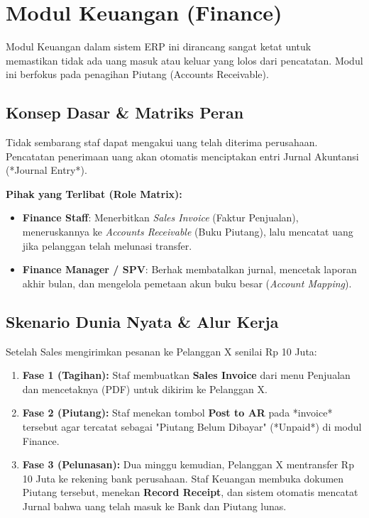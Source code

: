 \chapter{Modul Keuangan (Finance)}

Modul Keuangan dalam sistem ERP ini dirancang sangat ketat untuk memastikan tidak ada uang masuk atau keluar yang lolos dari pencatatan. Modul ini berfokus pada penagihan Piutang (Accounts Receivable).

\section{Konsep Dasar \& Matriks Peran}
Tidak sembarang staf dapat mengakui uang telah diterima perusahaan. Pencatatan penerimaan uang akan otomatis menciptakan entri Jurnal Akuntansi (*Journal Entry*).

\textbf{Pihak yang Terlibat (Role Matrix):}
\begin{itemize}
    \item \textbf{Finance Staff}: Menerbitkan \textit{Sales Invoice} (Faktur Penjualan), meneruskannya ke \textit{Accounts Receivable} (Buku Piutang), lalu mencatat uang jika pelanggan telah melunasi transfer.
    \item \textbf{Finance Manager / SPV}: Berhak membatalkan jurnal, mencetak laporan akhir bulan, dan mengelola pemetaan akun buku besar (\textit{Account Mapping}).
\end{itemize}

\section{Skenario Dunia Nyata \& Alur Kerja}
Setelah Sales mengirimkan pesanan ke Pelanggan X senilai Rp 10 Juta:
\begin{enumerate}
    \item \textbf{Fase 1 (Tagihan):} Staf membuatkan \textbf{Sales Invoice} dari menu Penjualan dan mencetaknya (PDF) untuk dikirim ke Pelanggan X.
    \item \textbf{Fase 2 (Piutang):} Staf menekan tombol \textbf{Post to AR} pada *invoice* tersebut agar tercatat sebagai "Piutang Belum Dibayar" (*Unpaid*) di modul Finance.
    \item \textbf{Fase 3 (Pelunasan):} Dua minggu kemudian, Pelanggan X mentransfer Rp 10 Juta ke rekening bank perusahaan. Staf Keuangan membuka dokumen Piutang tersebut, menekan \textbf{Record Receipt}, dan sistem otomatis mencatat Jurnal bahwa uang telah masuk ke Bank dan Piutang lunas.
\end{enumerate}

